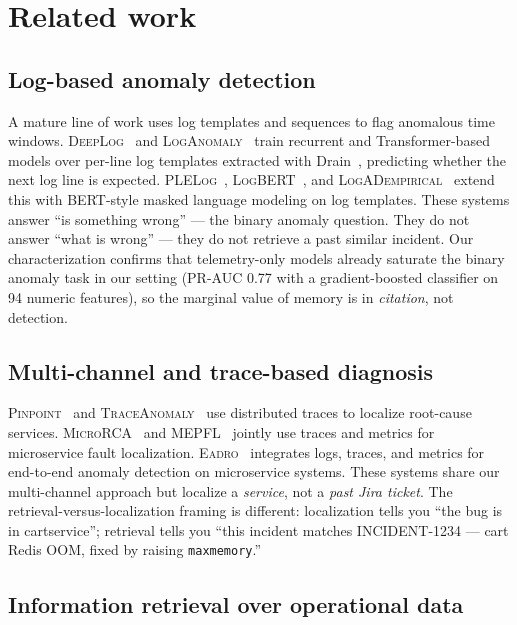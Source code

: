 \section{Related work}
\label{sec:related}

\subsection{Log-based anomaly detection}

A mature line of work uses log templates and sequences to flag anomalous time windows. \textsc{DeepLog}~\cite{du2017deeplog} and \textsc{LogAnomaly}~\cite{meng2019loganomaly} train recurrent and Transformer-based models over per-line log templates extracted with Drain~\cite{he2017drain}, predicting whether the next log line is expected. \textsc{PLELog}~\cite{yang2021plelog}, \textsc{LogBERT}~\cite{guo2021logbert}, and \textsc{LogADempirical}~\cite{le2023logadempirical} extend this with BERT-style masked language modeling on log templates. These systems answer ``is something wrong'' --- the binary anomaly question. They do not answer ``what is wrong'' --- they do not retrieve a past similar incident. Our characterization confirms that telemetry-only models already saturate the binary anomaly task in our setting (PR-AUC 0.77 with a gradient-boosted classifier on 94 numeric features), so the marginal value of memory is in \emph{citation}, not detection.

\subsection{Multi-channel and trace-based diagnosis}

\textsc{Pinpoint}~\cite{chen2002pinpoint} and \textsc{TraceAnomaly}~\cite{liu2020traceanomaly} use distributed traces to localize root-cause services. \textsc{MicroRCA}~\cite{wu2020microrca} and \textsc{MEPFL}~\cite{zhou2019mepfl} jointly use traces and metrics for microservice fault localization. \textsc{Eadro}~\cite{lee2023eadro} integrates logs, traces, and metrics for end-to-end anomaly detection on microservice systems. These systems share our multi-channel approach but localize a \emph{service}, not a \emph{past Jira ticket}. The retrieval-versus-localization framing is different: localization tells you ``the bug is in cartservice''; retrieval tells you ``this incident matches INCIDENT-1234 --- cart Redis OOM, fixed by raising \texttt{maxmemory}.''

\subsection{Information retrieval over operational data}

